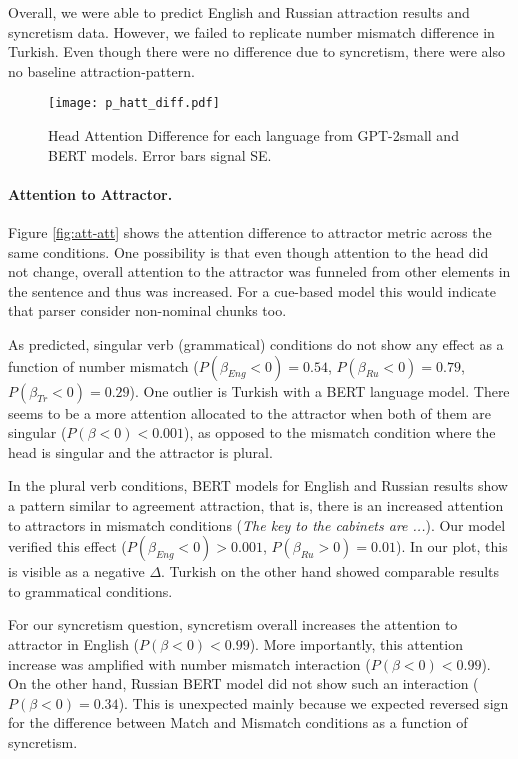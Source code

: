 \documentclass[10pt,letterpaper]{article}
\begin{document}
Overall, we were able to predict English and Russian attraction results and syncretism data. However, we failed to replicate number mismatch difference in Turkish. Even though there were no difference due to syncretism, there were also no baseline attraction-pattern. 

\begin{figure}[htb!]
    \centering
    \vspace*{-1em}\texttt{[image: p\_hatt\_diff.pdf]}
    \vspace*{-2em}\caption{Head Attention Difference for each language from GPT-2small and BERT models. Error bars signal SE.}
    \label{fig:head-att}
\end{figure}

\vspace*{-2.5em}
\paragraph{Attention to Attractor.}

Figure \ref{fig:att-att} shows the attention difference to attractor metric across the same conditions. One possibility is that even though attention to the head did not change, overall attention to the attractor was funneled from other elements in the sentence and thus was increased. For a cue-based model this would indicate that parser consider non-nominal chunks too. 

As predicted, singular verb (grammatical) conditions do not show any effect as a function of number mismatch ($P(\beta_{Eng} < 0) = 0.54$, $P(\beta_{Ru} < 0) = 0.79$, $P(\beta_{Tr} < 0) = 0.29$). One outlier is Turkish with a BERT language model. There seems to be a more attention allocated to the attractor when both of them are singular ($P(\beta < 0) < 0.001$), as opposed to the mismatch condition where the head is singular and the attractor is plural. 

In the plural verb conditions, BERT models for English and Russian results show a pattern similar to agreement attraction, that is, there is an increased attention to attractors in mismatch conditions (\textit{The key to the cabinets are ...}). Our model verified this effect ($P(\beta_{Eng} < 0) > 0.001$, $P(\beta_{Ru} > 0) = 0.01$). In our plot, this is visible as a negative $\Delta$. Turkish on the other hand showed comparable results to grammatical conditions. 

For our syncretism question, syncretism overall increases the attention to attractor in English ($P(\beta < 0) < 0.99$). More importantly, this attention increase was amplified with number mismatch interaction ($P(\beta < 0) < 0.99$). On the other hand, Russian BERT model did not show such an interaction  ($P(\beta < 0) = 0.34$). This is unexpected mainly because we expected reversed sign for the difference between Match and Mismatch conditions as a function of syncretism. 
\end{document}
